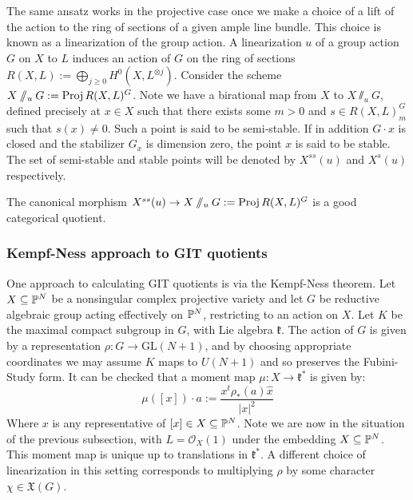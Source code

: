 The same ansatz works in the projective case once we make a choice of a lift of the action to the ring of sections of a given ample line bundle. This choice is known as a linearization of the group action.
%
%
%
%
%
%
A linearization \(u\) of a group action \(G\) on \(X\) to \(L\) induces an action of \(G\) on the ring of sections \(R(X,L) := \bigoplus_{j \ge 0} H^0(X,L^{\otimes j}) \). Consider the scheme \(X \sslash_u G := \operatorname{Proj} R(X,L)^G\). Note we have a birational map from \(X\) to \(X \sslash_u G\), defined precisely at \(x \in X\) such that there exists some \(m> 0 \) and \(s \in R(X,L)^G_m\) such that \(s(x) \neq 0\). Such a point is said to be semi-stable. If in addition \(G \cdot x\) is closed and the stabilizer \(G_x\) is dimension zero, the point \(x\) is said to be stable. The set of semi-stable and stable points will be denoted by \(X^{ss}(u)\) and \(X^{s}(u)\) respectively.
%
%
%
\begin{lemma}
The canonical morphism \(X^{ss}(u) \to X\sslash_u G := \operatorname{Proj} R(X,L)^G \) is a good categorical quotient.
\end{lemma}
\subsubsection{Kempf-Ness approach to GIT quotients}
One approach to calculating GIT quotients is via the Kempf-Ness theorem. Let \(X \subseteq \mathbb{P}^N\) be a nonsingular complex projective variety and let \(G\) be reductive algebraic group acting effectively on \(\mathbb{P}^N\), restricting to an action on \(X\). Let \(K\) be the maximal compact subgroup in \(G\), with Lie algebra \(\mathfrak{k}\). The action of \(G\) is given by a representation \(\rho: G \to \text{GL}(N+1)\), and by choosing appropriate coordinates we may assume \(K\) maps to \(U(N+1)\) and so preserves the Fubini-Study form. It can be checked that a moment map \(\mu: X \to \mathfrak{k}^*\) is given by:
\begin{equation}\label{eq:mu}
\mu([x]) \cdot a := \frac{x^t \rho_*(a) \hat{x}}{ |x|^2}
\end{equation}
Where \(x\) is any representative of \([x] \in X \subseteq \mathbb{P}^N\). Note we are now in the situation of the previous subsection, with \(L = \mathcal{O}_X(1)\) under the embedding \(X \subseteq \mathbb{P}^N\). This moment map is unique up to translations in \(\mathfrak{k}^*\). A different choice of linearization in this setting corresponds to multiplying \(\rho\) by some character \(\chi \in \mathfrak{X}(G)\).

